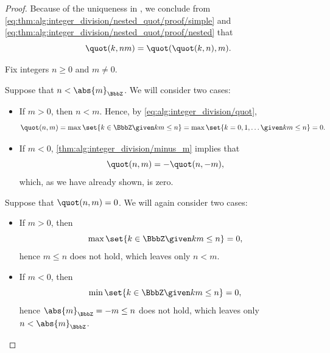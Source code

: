 \begin{proof}
  Because of the uniqueness in , we conclude from \eqref{eq:thm:alg:integer_division/nested_quot/proof/simple} and \eqref{eq:thm:alg:integer_division/nested_quot/proof/nested} that
  \begin{equation*}
    \quot(k, nm) = \quot(\quot(k, n), m).
  \end{equation*}

   Fix integers \( n \geq 0 \) and \( m \neq 0 \).

  \SufficiencySubProof* Suppose that \( n < \abs{m}_\BbbZ \). We will consider two cases:
  \begin{itemize}
    \item If \( m > 0 \), then \( n < m \). Hence, by \eqref{eq:alg:integer_division/quot},
    \begin{equation*}
      \quot(n, m)
      =
      \max\set{ k \in \BbbZ \given km \leq n }
      =
      \max\set{ k = 0, 1, \ldots \given km \leq n }
      =
      0.
    \end{equation*}

    \item If \( m < 0 \), \cref{thm:alg:integer_division/minus_m} implies that
    \begin{equation*}
      \quot(n, m) = -\quot(n, -m),
    \end{equation*}
    which, as we have already shown, is zero.
  \end{itemize}

  \NecessitySubProof* Suppose that \( \quot(n, m) = 0 \). We will again consider two cases:
  \begin{itemize}
    \item If \( m > 0 \), then
    \begin{equation*}
      \max\set{ k \in \BbbZ \given km \leq n } = 0,
    \end{equation*}
    hence \( m \leq n \) does not hold, which leaves only \( n < m \).

    \item If \( m < 0 \), then
    \begin{equation*}
      \min\set{ k \in \BbbZ \given km \leq n } = 0,
    \end{equation*}
    hence \( \abs{m}_\BbbZ = -m \leq n \) does not hold, which leaves only \( n < \abs{m}_\BbbZ \).
  \end{itemize}
\end{proof}

